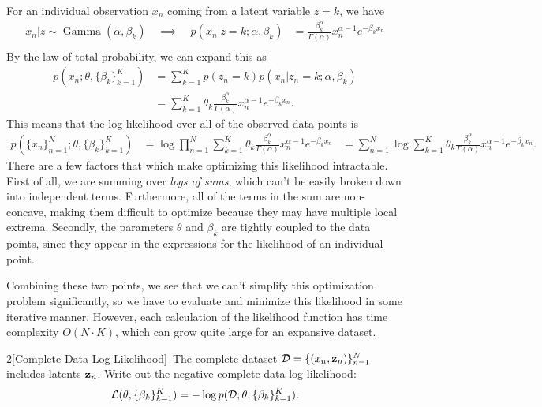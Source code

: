 \documentclass[expanded]{lkx_pset}
\begin{document}
\begin{solution}
	For an individual observation $x_n$ coming from a latent variable $z=k$, we have
	\[
		\begin{aligned}
			x_n|z \sim \operatorname{Gamma}(\alpha, \beta_k)
			\quad  \implies\quad p(x_n | z = k; \alpha, \beta_k)
			 & = \frac{\beta_k^\alpha}{\Gamma(\alpha)}x_n^{\alpha-1}e^{-\beta_k x_n} \\
		\end{aligned}
	\]
	By the law of total probability, we can expand this as
	\[
		\begin{aligned}
			p(x_n; \theta, \{\beta_k\}_{k=1}^K)
			 & = \sum^K_{k=1} p(z_n=k) p(x_n | z_n=k; \alpha,\beta_k)                                        \\
			 & = \sum^K_{k=1} \theta_k \frac{\beta_k^\alpha}{\Gamma(\alpha)}x^{\alpha-1}_n e^{-\beta_k x_n}.
		\end{aligned}
	\]
	This means that the log-likelihood over all of the observed data points is
	\[
		\begin{aligned}
			p(\{x_n\}^N_{n=1}; \theta, \{\beta_k\}^K_{k=1})
			 & = \log\prod^N_{n=1}
			\sum^K_{k=1} \theta_k \frac{\beta_k^\alpha}{\Gamma(\alpha)}x^{\alpha-1}_n e^{-\beta_k x_n}
			 & = \sum^N_{n=1}\log
			\sum^K_{k=1} \theta_k \frac{\beta_k^\alpha}{\Gamma(\alpha)}x^{\alpha-1}_n e^{-\beta_k x_n}.
		\end{aligned}
	\]
	There are a few factors that which make optimizing this likelihood intractable. First of all, we are summing over \emph{logs of sums}, which can't be easily broken down into independent terms. Furthermore, all of the terms in the sum are non-concave, making them difficult to optimize because they may have multiple local extrema. Secondly, the parameters $\theta$ and $\beta_k$ are tightly coupled to the data points, since they appear in the expressions for the likelihood of an individual point.

	Combining these two points, we see that we can't simplify this optimization problem significantly, so we have to evaluate and minimize this likelihood in some iterative manner. However, each calculation of the likelihood function has time complexity $O(N\cdot K)$, which can grow quite large for an expansive dataset.

	\begin{part}{2}[Complete Data Log Likelihood]\
		The complete dataset $\mathcal D = \{(x_n, \mathbf{z}_n)\}_{n=1}^N$ includes latents $\mathbf{z}_n$. Write out the negative complete data log likelihood: $$\mathcal{L}(\mathbf{\theta}, \{\beta_k\}^K_{k=1}) =  -\log p(\mathcal D; \mathbf{\theta}, \{\beta_k\}^K_{k=1}).$$


\end{part}
\end{solution}
\end{document}
